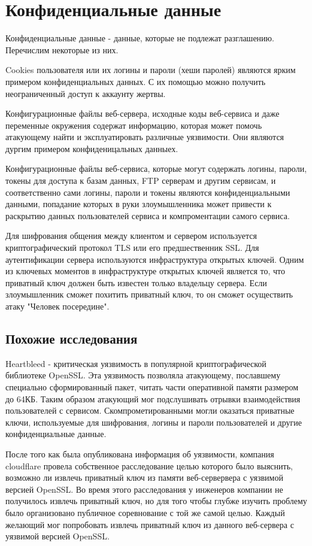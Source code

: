 \documentclass[20pt]{article}
\begin{document}
\newpage

\section{Конфиденциальные данные}
Конфиденциальные данные - данные, которые не подлежат разглашению. Перечислим
некоторые из них.

Cookies пользователя или их логины и пароли (хеши паролей) являются ярким
примером конфиденциальных данных. С их помощью можно получить неограниченный
доступ к аккаунту жертвы.

Конфигурационные файлы веб-сервера, исходные коды веб-сервиса и даже переменные
окружения содержат информацию, которая может помочь атакующему найти и
эксплуатировать различные уязвимости. Они являются дургим примером
конфиденицальных данныех.

Конфигурационные файлы веб-сервиса, которые могут содержать логины, пароли, токены
для доступа к базам данных, FTP серверам и другим сервисам, и соответственно сами
логины, пароли и токены являются конфиденциальными данными, попадание которых в
руки злоумышленника может привести к раскрытию данных пользователей сервиса и
компроментации самого сервиса.

Для шифрования общения между клиентом и сервером используется криптографический
протокол TLS\cite{tls} или его предшественник SSL. Для аутентификации сервера
используются инфраструктура открытых ключей\cite{pki}. Одним из ключевых моментов
в инфраструктуре открытых ключей является то, что приватный ключ должен быть
известен только владельцу сервера. Если злоумышленник сможет похитить приватный
ключ, то он сможет осуществить атаку "Человек посередине"\cite{mitm}.

\subsection{Похожие исследования}
Heartbleed\cite{heartbleed} - критическая уязвимость в популярной криптографической
библиотеке OpenSSL. Эта уязвимость позволяла атакующему, пославшему специально
сформированный пакет, читать части оперативной памяти размером до 64КБ. Таким
образом атакующий мог подслушивать отрывки взаимодействия пользователей с сервисом.
Скомпрометированными могли оказаться приватные ключи, используемые для шифрования,
логины и пароли пользователей и другие конфиденциальные данные.

После того как была опубликована информация об уязвимости, компания cloudflare
провела собственное расследование\cite{heartbleed/investigation} целью которого
было выяснить, возможно ли извлечь приватный ключ из памяти веб-сервервера с
уязвимой версией OpenSSL. Во время этого расследования у инженеров компании не
получилось извлечь приватный ключ, но для того чтобы глубже изучить проблему
было организовано публичное соревнование\cite{hearbleed/investigation} с той же
самой целью. Каждый желающий мог попробовать извлечь приватный ключ из
данного веб-сервера с уязвимой версией OpenSSL.
\end{document}
